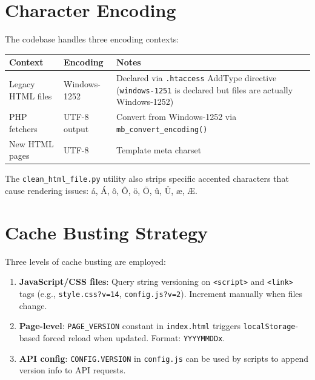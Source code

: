 \documentclass[12pt]{article}
\begin{document}
\section{Character Encoding}

The codebase handles three encoding contexts:

\begin{longtable}{p{3.5cm}p{3.5cm}p{6cm}}
\toprule
\textbf{Context} & \textbf{Encoding} & \textbf{Notes} \\
\midrule
Legacy HTML files & Windows-1252 & Declared via \texttt{.htaccess} AddType directive (\texttt{windows-1251} is declared but files are actually Windows-1252) \\
PHP fetchers & UTF-8 output & Convert from Windows-1252 via \texttt{mb\_convert\_encoding()} \\
New HTML pages & UTF-8 & Template meta charset \\
\bottomrule
\end{longtable}

The \texttt{clean\_html\_file.py} utility also strips specific accented characters that cause rendering issues: \'{a}, \'{A}, \^{o}, \^{O}, \"{o}, \"{O}, \^{u}, \^{U}, \ae, \AE.

\section{Cache Busting Strategy}

Three levels of cache busting are employed:

\begin{enumerate}
    \item \textbf{JavaScript/CSS files}: Query string versioning on \texttt{<script>} and \texttt{<link>} tags (e.g., \texttt{style.css?v=14}, \texttt{config.js?v=2}). Increment manually when files change.
    \item \textbf{Page-level}: \texttt{PAGE\_VERSION} constant in \texttt{index.html} triggers \texttt{localStorage}-based forced reload when updated. Format: \texttt{YYYYMMDDx}.
    \item \textbf{API config}: \texttt{CONFIG.VERSION} in \texttt{config.js} can be used by scripts to append version info to API requests.
\end{enumerate}
\end{document}
